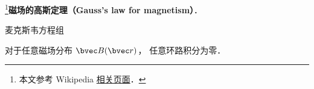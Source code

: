 
\begin{issues}
\issueDraft
\end{issues}


\footnote{本文参考 Wikipedia \href{https://en.wikipedia.org/wiki/Gauss's_law_for_magnetism}{相关页面}．}\textbf{磁场的高斯定理（Gauss's law for magnetism）}．

麦克斯韦方程组

对于任意磁场分布 $\bvec B(\bvec r)$， 任意环路积分为零．
